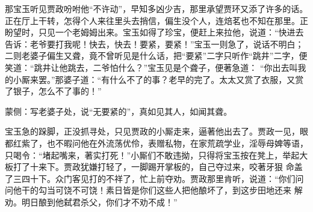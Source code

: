 \begin{parag}
    那宝玉听见贾政吩咐他“不许动”，早知多凶少吉，那里承望贾环又添了许多的话。正在厅上干转，怎得个人来往里头去捎信，偏生没个人，连焙茗也不知在那里。正盼望时，只见一个老姆姆出来。宝玉如得了珍宝，便赶上来拉他，说道：“快进去告诉：老爷要打我呢！快去，快去！要紧，要紧！”宝玉一则急了，说话不明白；二则老婆子偏生又聋，竟不曾听见是什么话，把“要紧”二字只听作“跳井”二字，便笑道：“跳井让他跳去，二爷怕什么？”宝玉见是个聋子，便著急道： “你出去叫我的小厮来罢。”那婆子道：“有什么不了的事？老早的完了。太太又赏了衣服，又赏了银子，怎么不了事的！”\begin{note}蒙侧：写老婆子处，说“无要紧的”，真如见其人，如闻其聋。\end{note}
\end{parag}


\begin{parag}
    宝玉急的跺脚，正没抓寻处，只见贾政的小厮走来，逼著他出去了。贾政一见，眼都红紫了，也不暇问他在外流荡优伶，表赠私物，在家荒疏学业，淫辱母婢等语，只喝令：“堵起嘴来，著实打死！”小厮们不敢违拗，只得将宝玉按在凳上，举起大板打了十来下。贾政犹嫌打轻了，一脚踢开掌板的，自己夺过来，咬著牙狠 命盖了三四十下。众门客见打的不祥了，忙上前夺劝。贾政那里肯听，说道：“你们问问他干的勾当可饶不可饶！素日皆是你们这些人把他酿坏了，到这步田地还来 解劝。明日酿到他弑君杀父，你们才不劝不成！”
\end{parag}


